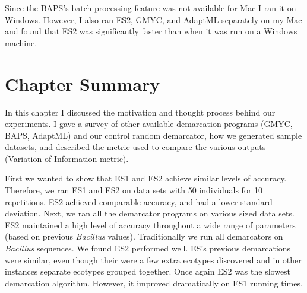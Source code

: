 Since the BAPS's batch processing feature was not available for Mac I ran it on Windows.
However, I also ran ES2, GMYC, and AdaptML separately on my Mac and found that ES2 was significantly faster than when it was run on a Windows machine.

\section{Chapter Summary}
In this chapter I discussed the motivation and thought process behind our experiments.
I gave a survey of other available demarcation programs (GMYC, BAPS, AdaptML) and our control random demarcator, how we generated sample datasets, and described the metric used to compare the various outputs (Variation of Information metric).

First we wanted to show that ES1 and ES2 achieve similar levels of accuracy.
Therefore, we ran ES1 and ES2 on data sets with 50 individuals for 10 repetitions.
ES2 achieved comparable accuracy, and had a lower standard deviation.
Next, we ran all the demarcator programs on various sized data sets.
ES2 maintained a high level of accuracy throughout a wide range of parameters (based on previous \emph{Bacillus} values).
Traditionally we run all demarcators on \emph{Bacillus} sequences.
We found ES2 performed well.
ES's previous demarcations were similar, even though their were a few extra ecotypes discovered and in other instances separate ecotypes grouped together.
Once again ES2 was the slowest demarcation algorithm.
However, it improved dramatically on ES1 running times.


